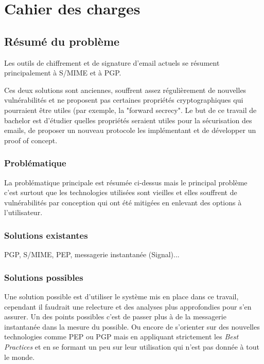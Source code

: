 \chapter{Cahier des charges}


\section*{Résumé du problème}
Les outils de chiffrement et de signature d'email actuels se résument principalement à S/MIME et à PGP. 

Ces deux solutions sont anciennes, souffrent assez régulièrement de nouvelles vulnérabilités et ne proposent pas certaines propriétés cryptographiques qui pourraient être utiles (par exemple, la "forward secrecy". Le but de ce travail de bachelor est d'étudier quelles propriétés seraient utiles pour la sécurisation des emails, de proposer un nouveau protocole les implémentant et de développer un proof of concept. 
\subsection*{Problématique}
La problématique principale est résumée ci-dessus mais le principal problème c'est surtout que les technologies utilisées sont vieilles et elles souffrent de vulnérabilités par conception qui ont été mitigées en enlevant des options à l'utilisateur.
\subsection*{Solutions existantes}
PGP, S/MIME, PEP, messagerie instantanée (Signal)...
\subsection*{Solutions possibles}
Une solution possible est d'utiliser le système mis en place dans ce travail, cependant il faudrait une relecture et des analyses plus approfondies pour s'en assurer.
Un des points possibles c'est de passer plus à de la messagerie instantanée dans la mesure du possible.
Ou encore de s'orienter sur des nouvelles technologies comme PEP ou PGP mais en appliquant strictement les \textit{Best Practices} et en se formant un peu sur leur utilisation qui n'est pas donnée à tout le monde.
